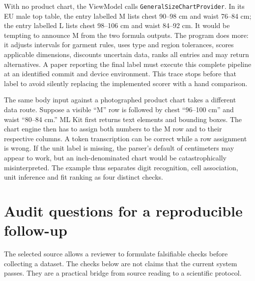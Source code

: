 \documentclass[11pt,a4paper]{article}
\begin{document}
With no product chart, the ViewModel calls \texttt{GeneralSizeChartProvider}. In its EU male top table, the entry labelled M lists chest 90--98 cm and waist 76--84 cm; the entry labelled L lists chest 98--106 cm and waist 84--92 cm. It would be tempting to announce M from the two formula outputs. The program does more: it adjusts intervals for garment rules, uses type and region tolerances, scores applicable dimensions, discounts uncertain data, ranks all entries and may return alternatives. A paper reporting the final label must execute this complete pipeline at an identified commit and device environment. This trace stops before that label to avoid silently replacing the implemented scorer with a hand comparison.

The same body input against a photographed product chart takes a different data route. Suppose a visible ``M'' row is followed by chest ``96--100 cm'' and waist ``80--84 cm.'' ML Kit first returns text elements and bounding boxes. The chart engine then has to assign both numbers to the M row and to their respective columns. A token transcription can be correct while a row assignment is wrong. If the unit label is missing, the parser's default of centimeters may appear to work, but an inch-denominated chart would be catastrophically misinterpreted. The example thus separates digit recognition, cell association, unit inference and fit ranking as four distinct checks.

\section{Audit questions for a reproducible follow-up}
The selected source allows a reviewer to formulate falsifiable checks before collecting a dataset. The checks below are not claims that the current system passes. They are a practical bridge from source reading to a scientific protocol.
\end{document}
